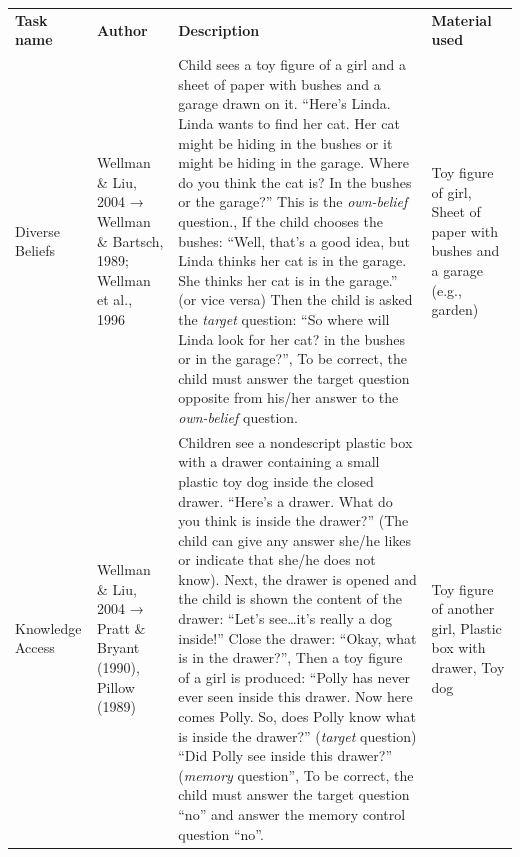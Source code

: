 \documentclass[
  man,floatsintext]{apa7}
\begin{document}
\begin{longtable}[]{@{}
  >{\raggedright\arraybackslash}p{}
  >{\raggedright\arraybackslash}p{}
  >{\raggedright\arraybackslash}p{}
  >{\raggedright\arraybackslash}p{}@{}}
\toprule\noalign{}
\endhead
\bottomrule\noalign{}
\endlastfoot
\textbf{Task name} & \textbf{Author} & \textbf{Description} & \textbf{Material used} \\
Diverse Beliefs & Wellman \& Liu, 2004 → Wellman \& Bartsch, 1989; Wellman et al., 1996 & Child sees a toy figure of a girl and a sheet of paper with bushes and a garage drawn on it. ``Here's Linda. Linda wants to find her cat. Her cat might be hiding in the bushes or it might be hiding in the garage. Where do you think the cat is? In the bushes or the garage?'' This is the \emph{own-belief} question., If the child chooses the bushes: ``Well, that's a good idea, but Linda thinks her cat is in the garage. She thinks her cat is in the garage.'' (or vice versa) Then the child is asked the \emph{target} question: ``So where will Linda look for her cat? in the bushes or in the garage?'', To be correct, the child must answer the target question opposite from his/her answer to the \emph{own-belief} question. & Toy figure of girl, Sheet of paper with bushes and a garage (e.g., garden) \\
Knowledge Access & Wellman \& Liu, 2004 → Pratt \& Bryant (1990), Pillow (1989) & Children see a nondescript plastic box with a drawer containing a small plastic toy dog inside the closed drawer. ``Here's a drawer. What do you think is inside the drawer?'' (The child can give any answer she/he likes or indicate that she/he does not know). Next, the drawer is opened and the child is shown the content of the drawer: ``Let's see\ldots it's really a dog inside!'' Close the drawer: ``Okay, what is in the drawer?'', Then a toy figure of a girl is produced: ``Polly has never ever seen inside this drawer. Now here comes Polly. So, does Polly know what is inside the drawer?'' (\emph{target} question) ``Did Polly see inside this drawer?'' (\emph{memory} question'', To be correct, the child must answer the target question ``no'' and answer the memory control question ``no''. & Toy figure of another girl, Plastic box with drawer, Toy dog \\

\end{longtable}
\end{document}

